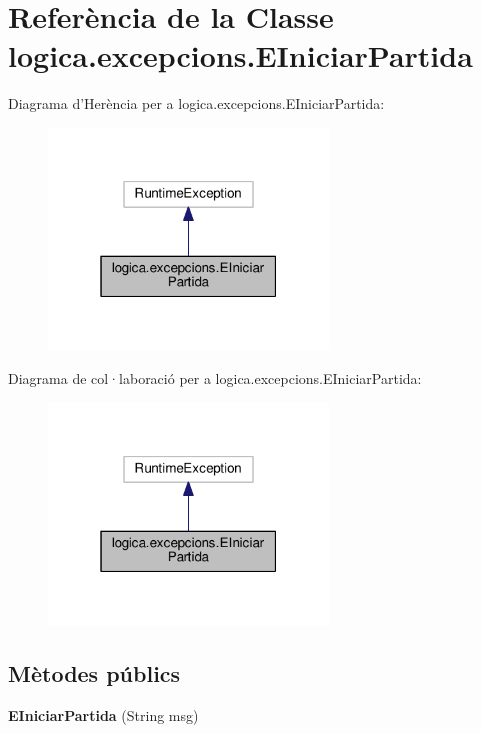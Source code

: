 \hypertarget{classlogica_1_1excepcions_1_1_e_iniciar_partida}{\section{Referència de la Classe logica.\+excepcions.\+E\+Iniciar\+Partida}
\label{classlogica_1_1excepcions_1_1_e_iniciar_partida}
}


Diagrama d'Herència per a logica.\+excepcions.\+E\+Iniciar\+Partida\+:\nopagebreak
\begin{figure}[H]
\begin{center}
\leavevmode
\includegraphics[width=211pt]{classlogica_1_1excepcions_1_1_e_iniciar_partida__inherit__graph}
\end{center}
\end{figure}


Diagrama de col·laboració per a logica.\+excepcions.\+E\+Iniciar\+Partida\+:\nopagebreak
\begin{figure}[H]
\begin{center}
\leavevmode
\includegraphics[width=211pt]{classlogica_1_1excepcions_1_1_e_iniciar_partida__coll__graph}
\end{center}
\end{figure}
\subsection*{Mètodes públics}
\begin{DoxyCompactItemize}
\item 
\hypertarget{classlogica_1_1excepcions_1_1_e_iniciar_partida_a8b48ce538aa814d3bd410488a3eaebd4}{{\bfseries E\+Iniciar\+Partida} (String msg)}\label{classlogica_1_1excepcions_1_1_e_iniciar_partida_a8b48ce538aa814d3bd410488a3eaebd4}

\end{DoxyCompactItemize}



